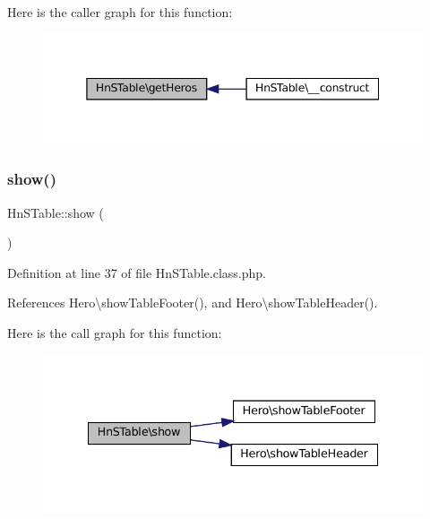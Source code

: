 Here is the caller graph for this function\+:\nopagebreak
\begin{figure}[H]
\begin{center}
\leavevmode
\includegraphics[width=345pt]{class_hn_s_table_a033a22727cb8e44dd8d8d874482d2258_icgraph}
\end{center}
\end{figure}
\mbox{\label{class_hn_s_table_a058cf0aad867aeac9886b190f8815b37}} 
\subsubsection{\texorpdfstring{show()}{show()}}
{\footnotesize\ttfamily Hn\+S\+Table\+::show (\begin{DoxyParamCaption}{ }\end{DoxyParamCaption})}



Definition at line 37 of file Hn\+S\+Table.\+class.\+php.



References Hero\textbackslash{}show\+Table\+Footer(), and Hero\textbackslash{}show\+Table\+Header().

Here is the call graph for this function\+:\nopagebreak
\begin{figure}[H]
\begin{center}
\leavevmode
\includegraphics[width=335pt]{class_hn_s_table_a058cf0aad867aeac9886b190f8815b37_cgraph}
\end{center}
\end{figure}


